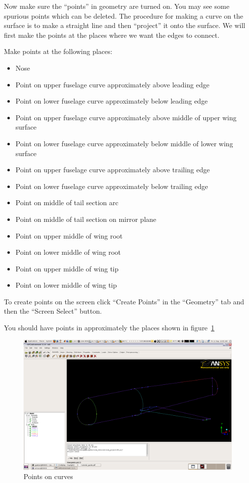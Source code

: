 \documentclass{report}
\begin{document}
Now make sure the ``points'' in geometry are turned on. You may see some spurious points which can be deleted. The procedure for making a curve on the surface is to make a straight line and then ``project'' it onto the surface. We will first make the points at the places where we want the edges to connect. 

Make points at the following places:

\begin{itemize}
\item Nose
\item Point on upper fuselage curve approximately above leading edge
\item Point on lower fuselage curve approximately below leading edge
\item Point on upper fuselage curve approximately above middle of upper wing surface
\item Point on lower fuselage curve approximately below middle of lower wing surface
\item Point on upper fuselage curve approximately above trailing edge
\item Point on lower fuselage curve approximately below trailing edge
\item Point on middle of tail section arc
\item Point on middle of tail section on mirror plane
\item Point on upper middle of wing root 
\item Point on lower middle of wing root
\item Point on upper middle of wing tip
\item Point on lower middle of wing tip
\end{itemize}

To create points on the screen click ``Create Points'' in the ``Geometry'' tab and then the ``Screen Select'' button.

You should have points in approximately the places shown in figure~\ref{fig:points}

\begin{figure}[htb]
  \centering
  \includegraphics[width=\textwidth,angle=0]{figures/fig5.png}
  \caption{Points on curves}
  \label{fig:points}
\end{figure}
\end{document}
